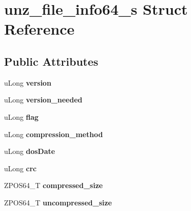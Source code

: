 \hypertarget{structunz__file__info64__s}{}\section{unz\+\_\+file\+\_\+info64\+\_\+s Struct Reference}
\label{structunz__file__info64__s}
\subsection*{Public Attributes}
\begin{DoxyCompactItemize}
\item 
\mbox{\label{structunz__file__info64__s_a4262e51be02716b887447e68c231006b}} 
u\+Long {\bfseries version}
\item 
\mbox{\label{structunz__file__info64__s_ad0041eacba37cb431242d9bd9c86d264}} 
u\+Long {\bfseries version\+\_\+needed}
\item 
\mbox{\label{structunz__file__info64__s_a9432647db394dbfd2a415d6c1184db92}} 
u\+Long {\bfseries flag}
\item 
\mbox{\label{structunz__file__info64__s_ac25e6f99bc51d046b8871ddbb4b5f9f7}} 
u\+Long {\bfseries compression\+\_\+method}
\item 
\mbox{\label{structunz__file__info64__s_a96e084f75d7f08f546789a0a4525470f}} 
u\+Long {\bfseries dos\+Date}
\item 
\mbox{\label{structunz__file__info64__s_a3026bf850e727543d9304c8deaf9eb27}} 
u\+Long {\bfseries crc}
\item 
\mbox{\label{structunz__file__info64__s_afefa321d4008a52a609d437ed4b4e03f}} 
Z\+P\+O\+S64\+\_\+T {\bfseries compressed\+\_\+size}
\item 
\mbox{\label{structunz__file__info64__s_a8cf74465a9d0641cdf1bb22c33f09b42}} 
Z\+P\+O\+S64\+\_\+T {\bfseries uncompressed\+\_\+size}
\item 
\mbox{\label{structunz__file__info64__s_ac09e3b96910b5f98ec73688116b6b3fd}} 

\end{DoxyCompactItemize}
